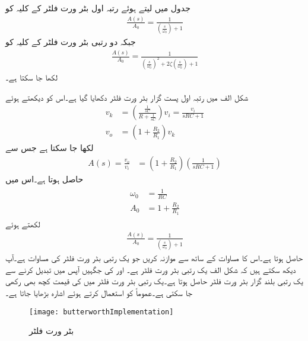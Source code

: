 جدول  میں  لیتے ہوئے رتبہ اول  بٹر ورت فلٹر کے کلیہ      کو
\begin{align}\label{مساوات_تعددی_بٹرورت_پہلا_درجہ}
\frac{A(s)}{A_0}=\frac{1}{\left(\frac{s}{\omega_0}\right)+1}
\end{align}
جبکہ دو رتبی بٹر ورت فلٹر کے کلیہ      کو
\begin{align}\label{مساوات_تعددی_بٹرورت_دوسرا_درجہ}
\frac{A(s)}{A_0}=\frac{1}{\left(\frac{s}{\omega_0} \right)^2+2 \zeta \left(\frac{s}{\omega_0} \right)+1}
\end{align}
لکھا جا سکتا ہے۔

شکل  الف میں رتبہ اول پست گزار بٹر ورت فلٹر دکھایا گیا ہے۔اس کو دیکھتے ہوئے
\begin{align*}
v_k&=\left(\frac{\frac{1}{sC}}{R+\frac{1}{sC}} \right) v_i=\frac{v_i}{sRC+1}\\
v_o&=\left(1+\frac{R_2}{R_1} \right)v_k
\end{align*}
لکھا جا سکتا ہے جس سے
\begin{align*}
A(s) =\frac{v_o}{v_i}&=\left(1+\frac{R_2}{R_1} \right)\left(\frac{1}{sRC+1}\right)
\end{align*}
حاصل ہوتا ہے۔اس میں
\begin{gather}
\begin{aligned}\label{مساوات_تعددی_ردعمل_بٹرورت_پہلا_درجہ}
\omega_0&=\frac{1}{RC}\\
A_0&=1+\frac{R_2}{R_1}
\end{aligned}
\end{gather}
لکھتے ہوئے
\begin{align*}
\frac{A(s)}{A_0}=\frac{1}{\left(\frac{s}{\omega_0}\right)+1}
\end{align*}
حاصل ہوتا ہے۔اس کا مساوات  کے ساتھ سے موازنہ کریں جو یک رتبی بٹر ورت فلٹر کی مساوات ہے۔آپ دیکھ سکتے ہیں کہ شکل  الف یک رتبی بٹر ورت فلٹر ہے۔ اور  کی جگہیں آپس میں تبدیل کرنے سے یک رتبی بلند گزار بٹر ورت فلٹر حاصل ہوتا ہے۔یک رتبی بٹر ورت فلٹر میں  کی قیمت کچھ بھی رکھی جا سکتی ہے۔عموماً  کو استعمال کرتے ہوئے اشارہ بڑھایا جاتا ہے۔
\begin{figure}
\centering
\texttt{[image: butterworthImplementation]}
\caption{بٹر ورت فلٹر}
\label{شکل_تعددی_ردعمل_بٹر_ورت_فلٹر_دور}
\end{figure}
%

